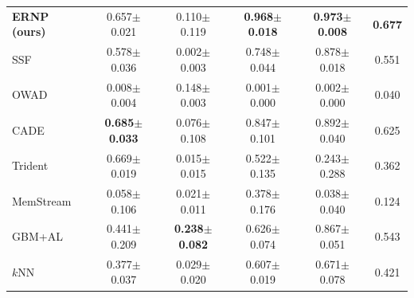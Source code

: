 \begin{tabular}{lccccc}
\textbf{ERNP (ours)} & 0.657$\pm$0.021 & 0.110$\pm$0.119 & \textbf{0.968$\pm$0.018} & \textbf{0.973$\pm$0.008} & \textbf{0.677}\\
SSF & 0.578$\pm$0.036 & 0.002$\pm$0.003 & 0.748$\pm$0.044 & 0.878$\pm$0.018 & 0.551\\
OWAD & 0.008$\pm$0.004 & 0.148$\pm$0.003 & 0.001$\pm$0.000 & 0.002$\pm$0.000 & 0.040\\
CADE & \textbf{0.685$\pm$0.033} & 0.076$\pm$0.108 & 0.847$\pm$0.101 & 0.892$\pm$0.040 & 0.625\\
Trident & 0.669$\pm$0.019 & 0.015$\pm$0.015 & 0.522$\pm$0.135 & 0.243$\pm$0.288 & 0.362\\
MemStream & 0.058$\pm$0.106 & 0.021$\pm$0.011 & 0.378$\pm$0.176 & 0.038$\pm$0.040 & 0.124\\
GBM+AL & 0.441$\pm$0.209 & \textbf{0.238$\pm$0.082} & 0.626$\pm$0.074 & 0.867$\pm$0.051 & 0.543\\
$k$NN & 0.377$\pm$0.037 & 0.029$\pm$0.020 & 0.607$\pm$0.019 & 0.671$\pm$0.078 & 0.421\\
\bottomrule
\end{tabular}
